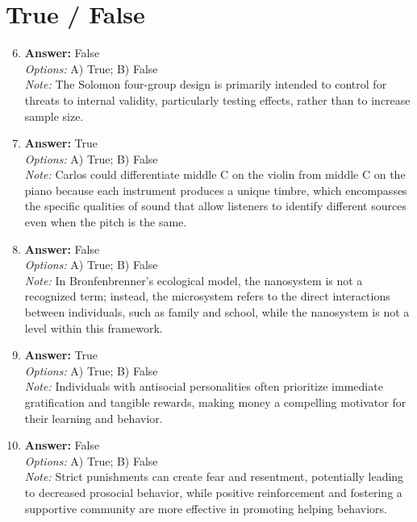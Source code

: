 \documentclass[12pt]{article}
\begin{document}
\section*{True / False}
\begin{enumerate}[label=\arabic*.]
\setcounter{enumi}{5}
\item \textbf{Answer:} False
\\ \textit{Options:} A) True; B) False
\\ \textit{Note:} The Solomon four-group design is primarily intended to control for threats to internal validity, particularly testing effects, rather than to increase sample size.
\item \textbf{Answer:} True
\\ \textit{Options:} A) True; B) False
\\ \textit{Note:} Carlos could differentiate middle C on the violin from middle C on the piano because each instrument produces a unique timbre, which encompasses the specific qualities of sound that allow listeners to identify different sources even when the pitch is the same.
\item \textbf{Answer:} False
\\ \textit{Options:} A) True; B) False
\\ \textit{Note:} In Bronfenbrenner's ecological model, the nanosystem is not a recognized term; instead, the microsystem refers to the direct interactions between individuals, such as family and school, while the nanosystem is not a level within this framework.
\item \textbf{Answer:} True
\\ \textit{Options:} A) True; B) False
\\ \textit{Note:} Individuals with antisocial personalities often prioritize immediate gratification and tangible rewards, making money a compelling motivator for their learning and behavior.
\item \textbf{Answer:} False
\\ \textit{Options:} A) True; B) False
\\ \textit{Note:} Strict punishments can create fear and resentment, potentially leading to decreased prosocial behavior, while positive reinforcement and fostering a supportive community are more effective in promoting helping behaviors.
\end{enumerate}
\end{document}
